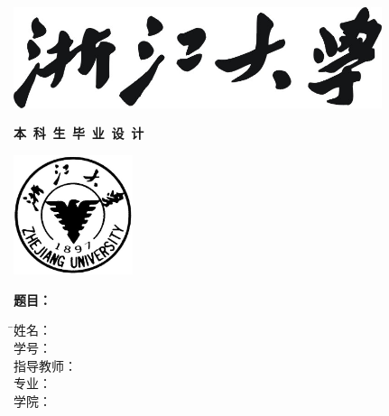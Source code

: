 
\thispagestyle{empty}

\vspace{5mm}

\begin{center}
   \includegraphics[width=108mm]{images/zjdx}
\end{center}

\centerline{\songti\erhao\textbf{本\, 科\, 生\, 毕\, 业\, 设\, 计}}

\vspace{4mm}

\begin{center}
  \includegraphics[width=35mm]{images/standxb}
\end{center}

\vspace{25mm}

{\hspace{16mm}\songti\sanhao\bfseries 题目：
  \hspace{2mm} \begin{minipage}[t]{98mm}\linespread{1.1}\uline{\zjutitlec}\end{minipage}}

\vspace{7mm}

\begin{tabbing}
    \hspace{30mm} \= \songti\sihao 姓\hspace{10mm}名： \= \underline{\makebox[6cm]{\sihao\zjuauthornamec}} \\[2mm]
    \> \songti\sihao 学\hspace{10mm}号： \> \underline{\makebox[6cm]{\sihao\zjuauthorid}} \\[2mm]
    \> \songti\sihao 指导教师： \> \underline{\makebox[6cm]{\sihao\zjumentorc}} \\[2mm]
    \> \songti\sihao 专\hspace{10mm}业： \= \underline{\makebox[6cm]{\sihao\zjugrade\hspace{3mm}\zjumajor}} \\[2mm]
    \> \songti\sihao 学\hspace{10mm}院： \> \underline{\makebox[6cm]{\sihao\zjucollegec}}
\end{tabbing}


